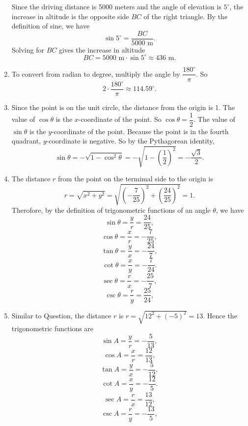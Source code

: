 \documentclass[
  12pt]{article}
\begin{document}
\begin{enumerate}
  Since the driving distance is 5000 meters and the angle of elevation
  is \(5^\circ\), the increase in altitude is the opposite side \(BC\)
  of the right triangle. By the definition of sine, we have
  \[\sin 5^\circ = \dfrac{BC}{5000 \text{ m}}.\] Solving for \(BC\)
  gives the increase in altitude
  \[BC = 5000 \text{ m} \cdot \sin 5^\circ \approx 436 \text{ m}.\]
\item
  To convert from radian to degree, multiply the angle by
  \(\dfrac{180^\circ}{\pi}\). So
  \[2 \cdot \dfrac{180^\circ}{\pi} \approx 114.59^\circ.\]
\item
  Since the point is on the unit circle, the distance from the origin is
  1. The value of \(\cos\theta\) is the \(x\)-coordinate of the point.
  So \(\cos\theta = \dfrac{1}{2}\). The value of \(\sin\theta\) is the
  \(y\)-coordinate of the point. Because the point is in the fourth
  quadrant, \(y\)-coordinate is negative. So by the Pythagorean
  identity,
  \[\sin\theta = -\sqrt{1-\cos^2\theta} = -\sqrt{1-\left(\dfrac{1}{2}\right)^2} = -\dfrac{\sqrt{3}}{2}.\]
\item
  The distance \(r\) from the point on the termimal side to the origin
  is
  \[r=\sqrt{x^2+y^2}=\sqrt{\left(-\frac{7}{25}\right)^2 + \left(\frac{24}{25}\right)^2}=1.\]
  Therofore, by the definition of trigonometric functions of an angle
  \(\theta\), we have \[\sin\theta = \frac{y}{r} = \frac{24}{25},\]
  \[\cos\theta = \frac{x}{r} = -\frac{7}{25},\]
  \[\tan\theta = \frac{y}{x} = -\frac{24}{7},\]
  \[\cot\theta = \frac{x}{y} = -\frac{7}{24}.\]
  \[\sec\theta = \frac{r}{x} = -\frac{25}{7},\]
  \[\csc\theta = \frac{r}{y} = \frac{25}{24},\]
\item
  Similar to Question, the distance \(r\) is
  \(r=\sqrt{12^2+(-5)^2}=13\). Hence the trigonometric functions are
  \[\sin A = \frac{y}{r} = -\frac{5}{13},\]
  \[\cos A = \frac{x}{r} = \frac{12}{13},\]
  \[\tan A = \frac{y}{x} = -\frac{5}{12},\]
  \[\cot A = \frac{x}{y} = -\frac{12}{5}.\]
  \[\sec A = \frac{r}{x} = \frac{13}{12},\]
  \[\csc A = \frac{r}{y} = -\frac{13}{5},\]
\end{enumerate}
\end{document}
